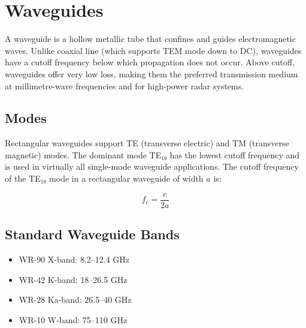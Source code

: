 \section{Waveguides}\label{sec:wiki_waveguide}



A waveguide is a hollow metallic tube that confines and guides electromagnetic waves. Unlike coaxial line (which supports TEM mode down to DC), waveguides have a cutoff frequency below which propagation does not occur. Above cutoff, waveguides offer very low loss, making them the preferred transmission medium at millimetre-wave frequencies and for high-power radar systems.

				

\subsection{Modes}

				


				

Rectangular waveguides support TE (transverse electric) and TM (transverse magnetic) modes. The dominant mode TE₁₀ has the lowest cutoff frequency and is used in virtually all single-mode waveguide applications. The cutoff frequency of the TE₁₀ mode in a rectangular waveguide of width $a$ is:


				
\[f_c = \dfrac{c}{2a}\]

				

\subsection{Standard Waveguide Bands}

				
\begin{itemize}

					\item WR-90 X-band: 8.2–12.4 GHz

					\item WR-42 K-band: 18–26.5 GHz

					\item WR-28 Ka-band: 26.5–40 GHz

					\item WR-10 W-band: 75–110 GHz

				
\end{itemize}

